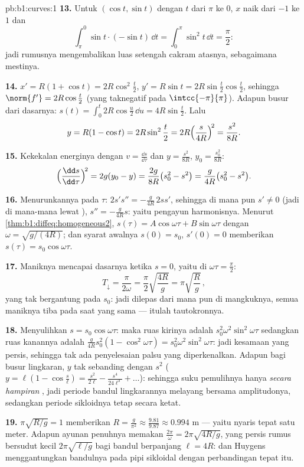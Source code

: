 \begin{solution}{pb:b1:curves:1}
\textbf{13.} Untuk $(\cos t, \sin t)$ dengan $t$ dari $\pi$ ke $0$,
$x$ naik dari $-1$ ke $1$ dan
\[
\int_\pi^0 \sin t\cdot(-\sin t)\,\dd t
= \int_0^\pi \sin^2 t\,\dd t = \frac\pi2 :
\]
jadi rumusnya mengembalikan luas setengah cakram atasnya, sebagaimana mestinya.

\textbf{14.} $x' = R(1 + \cos t) = 2R\cos^2\frac t2$, $y' =
R\sin t = 2R\sin\frac t2\cos\frac t2$, sehingga $\norm{f'} =
2R\cos\frac t2$ (yang taknegatif pada $\intcc{-\pi}{\pi}$). Adapun busur dari
dasarnya: $s(t) = \int_0^t 2R\cos\frac u2\,\dd u =
4R\sin\frac t2$. Lalu
\[
y = R(1 - \cos t) = 2R\sin^2\frac t2
= 2R\Bigl(\frac{s}{4R}\Bigr)^{\!2} = \frac{s^2}{8R} .
\]

\textbf{15.} Kekekalan energinya dengan $v = \frac{\dd s}{\dd\tau}$
dan $y = \frac{s^2}{8R}$, $y_0 = \frac{s_0^2}{8R}$:
\[
\Bigl(\frac{\dd s}{\dd\tau}\Bigr)^{\!2} = 2g(y_0 - y)
= \frac{2g}{8R}\bigl(s_0^2 - s^2\bigr)
= \frac{g}{4R}\bigl(s_0^2 - s^2\bigr).
\]

\textbf{16.} Menurunkannya pada $\tau$: $2s's'' =
-\frac{g}{4R}\,2ss'$, sehingga di mana pun $s' \neq 0$ (jadi di mana-mana
lewat ), $s'' = -\frac{g}{4R}s$: yaitu pengayun harmonisnya.
Menurut \cref{thm:b1:diffeq:homogeneous2}, $s(\tau) =
A\cos\omega\tau + B\sin\omega\tau$ dengan $\omega =
\sqrt{g/(4R)}$; dan syarat awalnya $s(0) = s_0$, $s'(0) = 0$
memberikan $s(\tau) = s_0\cos\omega\tau$.

\textbf{17.} Maniknya mencapai dasarnya ketika $s = 0$, yaitu di
$\omega\tau = \frac\pi2$:
\[
T_{\downarrow} = \frac{\pi}{2\omega}
= \frac\pi2\sqrt{\frac{4R}{g}} = \pi\sqrt{\frac Rg}\,,
\]
yang tak bergantung pada $s_0$: jadi dilepas dari mana pun di mangkuknya, semua
maniknya tiba pada saat yang sama --- itulah tautokronnya.

\textbf{18.} Menyulihkan $s = s_0\cos\omega\tau$: maka ruas kirinya
adalah $s_0^2\omega^2\sin^2\omega\tau$ sedangkan ruas kanannya adalah
$\frac{g}{4R}s_0^2(1 - \cos^2\omega\tau) =
s_0^2\omega^2\sin^2\omega\tau$: jadi kesamaan yang persis, sehingga tak ada
penyelesaian palsu yang diperkenalkan. Adapun bagi busur lingkaran, $y$ tak
sebanding dengan $s^2$ ($y = \ell(1 - \cos\frac s\ell) =
\frac{s^2}{2\ell} - \frac{s^4}{24\ell^3} + \dots$): sehingga
suku pemulihnya hanya \emph{secara hampiran} , jadi
periode bandul lingkarannya melayang bersama amplitudonya, sedangkan
periode sikloidnya tetap secara ketat.

\textbf{19.} $\pi\sqrt{R/g} = 1$ memberikan $R = \frac{g}{\pi^2}
\approx \frac{9.81}{9.87} \approx 0.994$ m --- yaitu nyaris tepat
satu meter. Adapun ayunan penuhnya memakan $\frac{2\pi}\omega =
2\pi\sqrt{4R/g}$, yang persis rumus bersudut kecil
$2\pi\sqrt{\ell/g}$ bagi bandul berpanjang $\ell = 4R$:
dan Huygens menggantungkan bandulnya pada pipi sikloidal dengan
perbandingan tepat itu.


\end{solution}
